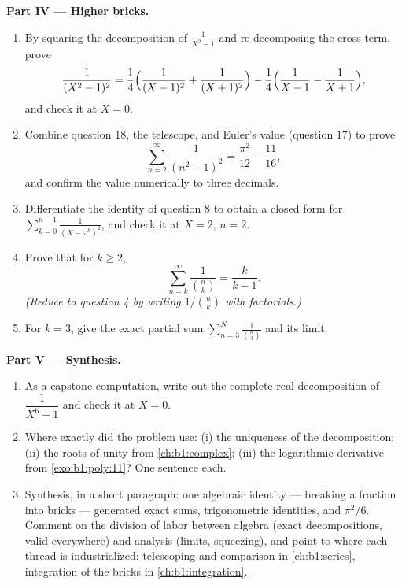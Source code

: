 \begin{problem}
\medskip
\noindent\textbf{Part IV --- Higher bricks.}
\begin{enumerate}[resume]
  \item By squaring the decomposition of $\frac1{X^2-1}$ and
        re-decomposing the cross term, prove
        \[
        \frac1{(X^2-1)^2}
        = \frac14\Bigl(\frac1{(X-1)^2} + \frac1{(X+1)^2}\Bigr)
        - \frac14\Bigl(\frac1{X-1} - \frac1{X+1}\Bigr),
        \]
        and check it at $X = 0$.
  \item Combine question 18, the telescope, and Euler's value
        (question 17) to prove
        \[
        \sum_{n=2}^{\infty}\frac1{(n^2-1)^2}
        = \frac{\pi^2}{12} - \frac{11}{16} ,
        \]
        and confirm the value numerically to three decimals.
  \item Differentiate the identity of question 8 to obtain a
        closed form for $\sum_{k=0}^{n-1}\frac1{(X -
        \omega^k)^2}$, and check it at $X = 2$, $n = 2$.
  \item Prove that for $k \geq 2$,
        \[
        \sum_{n=k}^{\infty}\frac{1}{\binom nk} = \frac{k}{k-1} .
        \]
        \emph{(Reduce to question 4 by writing $1/\binom nk$ with
        factorials.)}
  \item For $k = 3$, give the exact partial sum
        $\sum_{n=3}^{N}\frac1{\binom n3}$ and its limit.
\end{enumerate}

\medskip
\noindent\textbf{Part V --- Synthesis.}
\begin{enumerate}[resume]
  \item As a capstone computation, write out the complete real
        decomposition of $\dfrac1{X^6 - 1}$ and check it at $X =
        0$.
  \item Where exactly did the problem use: (i) the uniqueness of
        the decomposition; (ii) the roots of unity from
        \cref{ch:b1:complex}; (iii) the logarithmic derivative
        from \cref{exo:b1:poly:11}? One sentence each.
  \item Synthesis, in a short paragraph: one algebraic identity
        --- breaking a fraction into bricks --- generated exact
        sums, trigonometric identities, and $\pi^2/6$. Comment on
        the division of labor between algebra (exact
        decompositions, valid everywhere) and analysis (limits,
        squeezing), and point to where each thread is
        industrialized: telescoping and comparison in
        \cref{ch:b1:series}, integration of the bricks in
        \cref{ch:b1:integration}.
\end{enumerate}
\end{problem}
